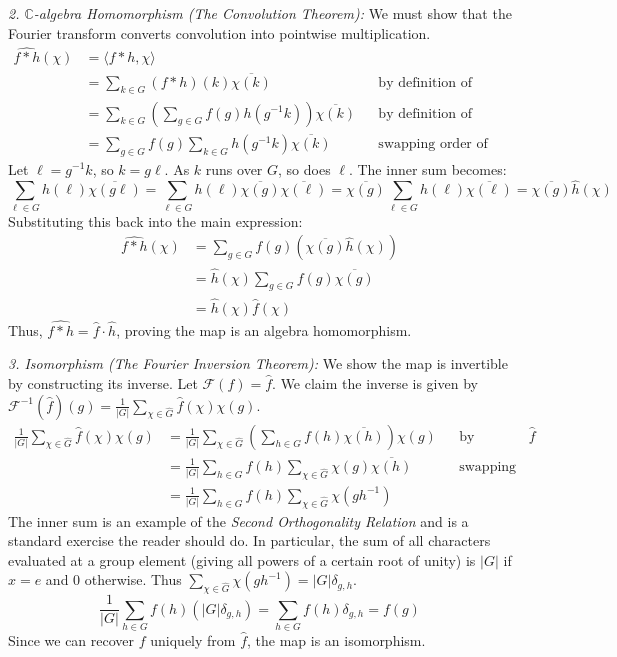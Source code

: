 \documentclass{article}
\newcommand{\C}{{\mathbb{C}}}
\begin{document}
\begin{Proof}
\begin{enumerate}
		\textit{2. $\C$-algebra Homomorphism (The Convolution Theorem):} We must show that the Fourier transform converts convolution into pointwise multiplication.
		\begin{align*}
			\widehat{f*h}(\chi) &= \langle f*h, \chi \rangle \\
			&= \sum_{k \in G} (f*h)(k) \overline{\chi(k)} && \text{by definition of inner product} \\
			&= \sum_{k \in G} \left( \sum_{g \in G} f(g)h(g^{-1}k) \right) \overline{\chi(k)} && \text{by definition of convolution} \\
			&= \sum_{g \in G} f(g) \sum_{k \in G} h(g^{-1}k) \overline{\chi(k)} && \text{swapping order of summation}
		\end{align*}
		Let $\ell  = g^{-1}k$, so $k = g\ell $. As $k$ runs over $G$, so does $\ell $. The inner sum becomes:
		\[
			\sum_{\ell  \in G} h(\ell ) \overline{\chi(g\ell )} = \sum_{\ell  \in G} h(\ell ) \overline{\chi(g)}\overline{\chi(\ell )} = \overline{\chi(g)} \sum_{\ell  \in G} h(\ell )\overline{\chi(\ell )} = \overline{\chi(g)} \hat{h}(\chi)
		\]
		Substituting this back into the main expression:
		\begin{align*}
			\widehat{f*h}(\chi) &= \sum_{g \in G} f(g) \left(\overline{\chi(g)} \hat{h}(\chi)\right) \\
			&= \hat{h}(\chi) \sum_{g \in G} f(g) \overline{\chi(g)} \\
			&= \hat{h}(\chi) \hat{f}(\chi)
		\end{align*}
		Thus, $\widehat{f*h} = \hat{f} \cdot \hat{h}$, proving the map is an algebra homomorphism.

		\textit{3. Isomorphism (The Fourier Inversion Theorem):} We show the map is invertible by constructing its inverse. Let $\mathcal{F}(f) = \hat{f}$. We claim the inverse is given by $\mathcal{F}^{-1}(\hat{f})(g) = \frac{1}{|G|}\sum_{\chi \in \hat{G}} \hat{f}(\chi)\chi(g)$.
		\begin{align*}
			\frac{1}{|G|}\sum_{\chi \in \hat{G}} \hat{f}(\chi)\chi(g) &= \frac{1}{|G|}\sum_{\chi \in \hat{G}} \left( \sum_{h \in G} f(h)\overline{\chi(h)} \right) \chi(g) && \text{by definition of } \hat{f}\\
			&= \frac{1}{|G|} \sum_{h \in G} f(h) \sum_{\chi \in \hat{G}} \chi(g)\overline{\chi(h)} && \text{swapping order of summation} \\
      &= \frac{1}{|G|} \sum_{h \in G} f(h) \sum_{\chi \in \hat{G}} \chi(gh^{-1})
		\end{align*}
		The inner sum is an example of the \emph{Second Orthogonality Relation} and is a standard exercise the
		reader should do. In particular, the sum of all characters evaluated at a group element (giving all
		powers of a certain root of unity) is $|G|$ if $x=e$ and $0$ otherwise. Thus $\sum_{\chi \in \hat{G}}
    \chi(gh^{-1}) = |G|\delta_{g,h}$.
		\[
			\frac{1}{|G|} \sum_{h \in G} f(h) (|G|\delta_{g,h}) = \sum_{h \in G} f(h)\delta_{g,h} = f(g)
		\]
		Since we can recover $f$ uniquely from $\hat{f}$, the map is an isomorphism.


\end{enumerate}
\end{Proof}
\end{document}
